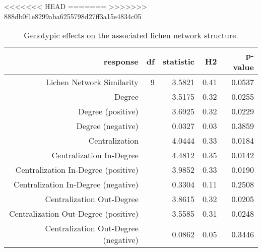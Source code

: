 <<<<<<< HEAD
=======
>>>>>>> 888db0f1e8299aba6255798d27ff3a15e4834c05
\begin{table}[ht]
\centering
\begin{tabular}{rrrrr}
  \hline
response & df & statistic & H2 & p-value \\ 
  \hline
Lichen Network Similarity & 9 & 3.5821 & 0.41 & 0.0537 \\ 
  Degree &  & 3.5175 & 0.32 & 0.0255 \\ 
  Degree (positive) &  & 3.6925 & 0.32 & 0.0229 \\ 
  Degree (negative) &  & 0.0327 & 0.03 & 0.3859 \\ 
  Centralization &  & 4.0444 & 0.33 & 0.0184 \\ 
  Centralization In-Degree &  & 4.4812 & 0.35 & 0.0142 \\ 
  Centralization In-Degree (positive) &  & 3.9852 & 0.33 & 0.0190 \\ 
  Centralization In-Degree (negative) &  & 0.3304 & 0.11 & 0.2508 \\ 
  Centralization Out-Degree &  & 3.8615 & 0.32 & 0.0205 \\ 
  Centralization Out-Degree (positive) &  & 3.5585 & 0.31 & 0.0248 \\ 
  Centralization Out-Degree (negative) &  & 0.0862 & 0.05 & 0.3446 \\ 
   \hline
\end{tabular}
\caption{Genotypic effects on the associated lichen network structure.} 
\label{tab:h2_net}
\end{table}
